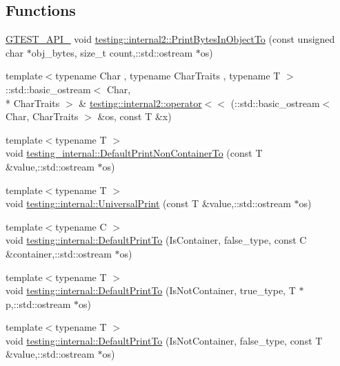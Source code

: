 \subsection*{Functions}
\begin{DoxyCompactItemize}
\item 
\hyperlink{gtest-port_8h_aa73be6f0ba4a7456180a94904ce17790}{G\+T\+E\+S\+T\+\_\+\+A\+P\+I\+\_\+} void \hyperlink{namespacetesting_1_1internal2_a04a384ee5de3a9f4f00a6052ea79b495}{testing\+::internal2\+::\+Print\+Bytes\+In\+Object\+To} (const unsigned char $\ast$obj\+\_\+bytes, size\+\_\+t count,\+::std\+::ostream $\ast$os)
\item 
{\footnotesize template$<$typename Char , typename Char\+Traits , typename T $>$ }\\\+::std\+::basic\+\_\+ostream$<$ Char, \\*
Char\+Traits $>$ \& \hyperlink{namespacetesting_1_1internal2_a07dbe129beb8952074f04b599dfce39b}{testing\+::internal2\+::operator$<$$<$} (\+::std\+::basic\+\_\+ostream$<$ Char, Char\+Traits $>$ \&os, const T \&x)
\item 
{\footnotesize template$<$typename T $>$ }\\void \hyperlink{namespacetesting__internal_ad4e5852805f397248a0867c0c4265ea5}{testing\+\_\+internal\+::\+Default\+Print\+Non\+Container\+To} (const T \&value,\+::std\+::ostream $\ast$os)
\item 
{\footnotesize template$<$typename T $>$ }\\void \hyperlink{namespacetesting_1_1internal_ad121a890bddf866e59605d1a0198dada}{testing\+::internal\+::\+Universal\+Print} (const T \&value,\+::std\+::ostream $\ast$os)
\item 
{\footnotesize template$<$typename C $>$ }\\void \hyperlink{namespacetesting_1_1internal_a729016f07085b1cfb44d21331f791141}{testing\+::internal\+::\+Default\+Print\+To} (Is\+Container, false\+\_\+type, const C \&container,\+::std\+::ostream $\ast$os)
\item 
{\footnotesize template$<$typename T $>$ }\\void \hyperlink{namespacetesting_1_1internal_aa8dafaf55c18333baa5fdb858e69be96}{testing\+::internal\+::\+Default\+Print\+To} (Is\+Not\+Container, true\+\_\+type, T $\ast$p,\+::std\+::ostream $\ast$os)
\item 
{\footnotesize template$<$typename T $>$ }\\void \hyperlink{namespacetesting_1_1internal_a29e705ab252af57e825a086bb49c4831}{testing\+::internal\+::\+Default\+Print\+To} (Is\+Not\+Container, false\+\_\+type, const T \&value,\+::std\+::ostream $\ast$os)

\end{DoxyCompactItemize}
